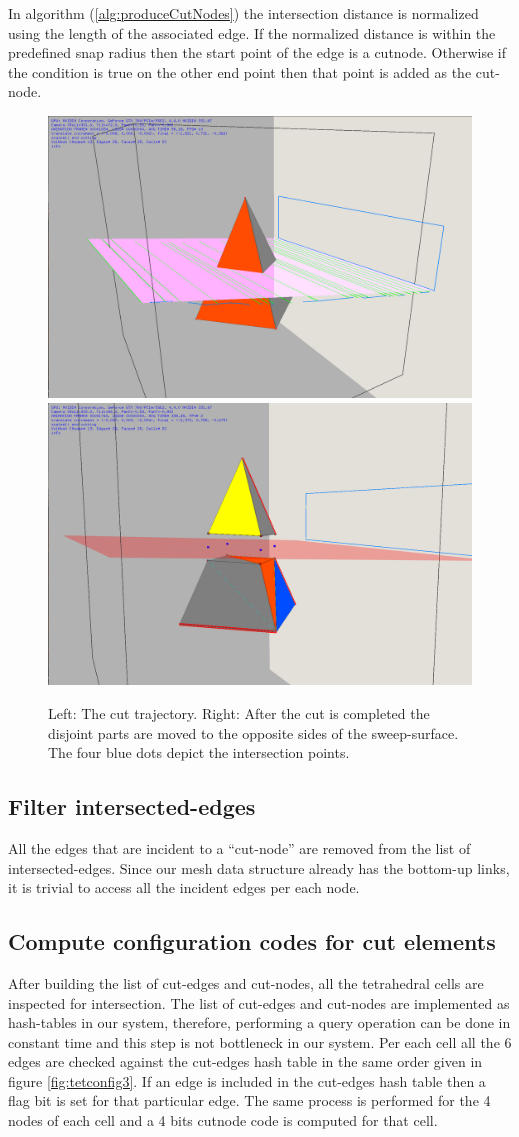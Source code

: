 In algorithm (\ref{alg:produceCutNodes}) the intersection distance is normalized using the length of the associated edge.
If the normalized distance is within the predefined snap radius then the start point of the edge is a cutnode. Otherwise
if the condition is true on the other end point then that point is added as the cut-node.

\begin{figure}[H]
  \centering
  \includegraphics[width=0.5\linewidth]{figures/cutting/beforecut.png}
  \includegraphics[width=0.5\linewidth]{figures/cutting/aftercut.png}
  \caption{\label{fig:twotetsexample}
  {Left: The cut trajectory. Right: After the cut is completed the disjoint parts are moved to the opposite sides of the sweep-surface.
  The four blue dots depict the intersection points.}
}
\end{figure}

\subsection{Filter intersected-edges}
All the edges that are incident to a ``cut-node'' are removed from the list of intersected-edges. Since our mesh data structure 
already has the bottom-up links, it is trivial to access all the incident edges per each node. 


\subsection{Compute configuration codes for cut elements}
After building the list of cut-edges and cut-nodes, all the tetrahedral cells are inspected for intersection. 
The list of cut-edges and cut-nodes are implemented as hash-tables in our system, therefore, performing a query operation can be done 
in constant time and this step is not bottleneck in our system. Per each cell all the 6 edges are checked against the cut-edges hash table 
in the same order given in figure \ref{fig:tetconfig3}. If an edge is included in the cut-edges hash table then a flag bit is set for that
particular edge. The same process is performed for the 4 nodes of each cell and a 4 bits cutnode code is computed for that cell.

